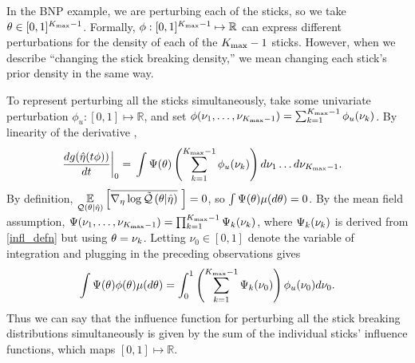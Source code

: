 \begin{ex}
%
In the BNP example, we are perturbing each of the sticks, so we take $\theta \in
[0,1]^{{K_{\mathrm{max}}} - 1}$.  Formally, $\phi: [0,1]^{{K_{\mathrm{max}}} - 1} \mapsto \mathbb{R}$ can
express different perturbations for the density of each of the ${K_{\mathrm{max}}} - 1$
sticks.  However, when we describe ``changing the stick breaking density,'' we
mean changing each stick's prior density in the same way.

To represent perturbing all the sticks simultaneously, take some univariate
perturbation $\phi_{u}: [0,1] \mapsto \mathbb{R}$, and set $\phi(\nu_1, \ldots,
\nu_{{K_{\mathrm{max}}} - 1}) = \sum_{k=1}^{{K_{\mathrm{max}}} - 1} \phi_{u}(\nu_{k})$. By linearity of the
derivative ,
%
\begin{align*}
%
\fracat{d g(\etaopt(\t \phi))}{d \t}{0} ={}&
    \int \infl(\theta) \left(
        \sum_{\k=1}^{\kmax - 1} \phi_{u}(\nuk) \right)
    d\nu_1 \ldots d \nu_{\kmax - 1}.
%
\end{align*}
%
By definition, $\underset{\mathcal{Q}(\theta \vert \hat\eta)}{\mathbb{E}}\left[\overline{{\nabla_\eta \log \tilde{\mathcal{Q}}}\left(\theta \vert
\hat\eta\right)}\,\,\right] = 0$, so $\int \Psi(\theta) \mu(d\theta) = 0$.  By the mean field
assumption, $\Psi(\nu_1, \ldots, \nu_{{K_{\mathrm{max}}} - 1}) = \prod_{k=1}^{{K_{\mathrm{max}}} - 1}
\Psi_k(\nu_{k})$, where $\Psi_k(\nu_{k})$ is derived from \eqref{infl_defn} but
using $\theta = \nu_{k}$.  Letting $\nu_0 \in [0,1]$ denote the variable of
integration and plugging in the preceding observations gives
%
\begin{align*}
%
\int \infl(\theta) \phi(\theta) \mu(d\theta) =
    \int_0^1 \left(\sum_{\k=1}^{\kmax - 1} \infl_k(\nu_0) \right)
        \phi_{u}(\nu_0) d \nu_0.
%
\end{align*}
%
Thus we can say that the influence function for perturbing all the stick
breaking distributions simultaneously is given by the sum of the
individual sticks' influence functions, which maps $[0,1] \mapsto \mathbb{R}$.
%
\end{ex}
